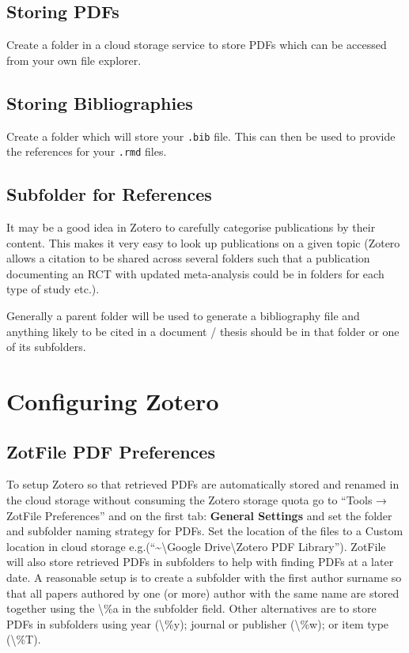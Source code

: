 \documentclass[
]{book}
\begin{document}
\hypertarget{storing-pdfs}{%
\subsection{Storing PDFs}\label{storing-pdfs}}

Create a folder in a cloud storage service to store PDFs which can be accessed from your own file explorer.

\hypertarget{storing-bibliographies}{%
\subsection{Storing Bibliographies}\label{storing-bibliographies}}

Create a folder which will store your \texttt{.bib} file. This can then be used to provide the references for your \texttt{.rmd} files.

\hypertarget{subfolder-for-references}{%
\subsection{Subfolder for References}\label{subfolder-for-references}}

It may be a good idea in Zotero to carefully categorise publications by their content. This makes it very easy to look up publications on a given topic (Zotero allows a citation to be shared across several folders such that a publication documenting an RCT with updated meta-analysis could be in folders for each type of study etc.).

Generally a parent folder will be used to generate a bibliography file and anything likely to be cited in a document / thesis should be in that folder or one of its subfolders.

\hypertarget{configuring-zotero}{%
\section{Configuring Zotero}\label{configuring-zotero}}

\hypertarget{zotfile-pdf-preferences}{%
\subsection{ZotFile PDF Preferences}\label{zotfile-pdf-preferences}}

To setup Zotero so that retrieved PDFs are automatically stored and renamed in the cloud storage without consuming the Zotero storage quota go to ``Tools → ZotFile Preferences'' and on the first tab: \textbf{General Settings} and set the folder and subfolder naming strategy for PDFs. Set the location of the files to a Custom location in cloud storage e.g.(``\textasciitilde\textbackslash Google Drive\textbackslash Zotero PDF Library''). ZotFile will also store retrieved PDFs in subfolders to help with finding PDFs at a later date. A reasonable setup is to create a subfolder with the first author surname so that all papers authored by one (or more) author with the same name are stored together using the \textbackslash\%a in the subfolder field. Other alternatives are to store PDFs in subfolders using year (\textbackslash\%y); journal or publisher (\textbackslash\%w); or item type (\textbackslash\%T).
\end{document}
